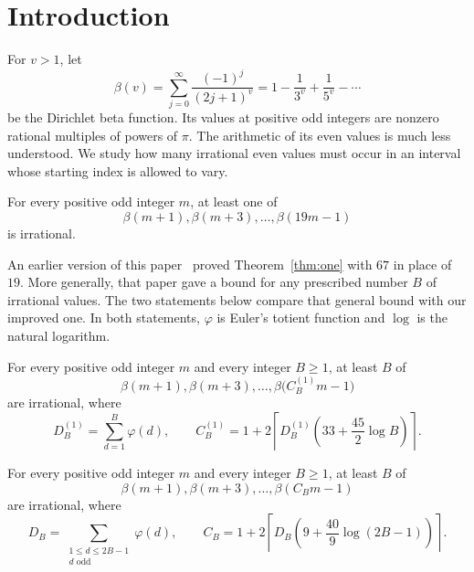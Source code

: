 \section{Introduction}\label{sec:introduction}

For $v>1$, let
\[
 \beta(v)=\sum_{j=0}^{\infty}\frac{(-1)^j}{(2j+1)^v}
         =1-\frac1{3^v}+\frac1{5^v}-\cdots
\]
be the Dirichlet beta function. Its values at positive odd integers
are nonzero rational multiples of powers of $\pi$. The arithmetic
of its even values is much less understood. We study how many
irrational even values must occur in an interval whose starting
index is allowed to vary.

\begin{theorem}\label{thm:one}
For every positive odd integer $m$, at least one of
\[
 \beta(m+1),\beta(m+3),\ldots,\beta(19m-1)
\]
is irrational.
\end{theorem}

\noindent\begin{minipage}{\linewidth}
An earlier version of this paper~\cite{TshiftV1} proved
Theorem~\ref{thm:one} with $67$ in place of $19$. More generally,
that paper gave a bound for any prescribed number $B$ of irrational values.
The two statements below compare that general bound with our
improved one.
In both statements, $\varphi$ is Euler's totient function and
$\log$ is the natural logarithm.

\begin{previousversion}
For every positive odd integer $m$ and every integer $B\ge1$,
at least $B$ of
\[
 \beta(m+1),\beta(m+3),\ldots,\beta\bigl(C_B^{(1)}m-1\bigr)
\]
are irrational, where
\[
 D_B^{(1)}=\sum_{d=1}^B\varphi(d),\qquad
 C_B^{(1)}=1+2\left\lceil D_B^{(1)}
                    \left(33+\frac{45}{2}\log B\right)\right\rceil.
\]
\end{previousversion}

\begin{theorem}\label{thm:intervals}
For every positive odd integer $m$ and every integer $B\ge1$,
at least $B$ of
\[
 \beta(m+1),\beta(m+3),\ldots,\beta(C_Bm-1)
\]
are irrational, where
\begin{equation}\label{eq:closed-endpoint}
 D_B=\sum_{\substack{1\le d\le2B-1\\d\text{ odd}}}\varphi(d),
 \qquad
 C_B=1+2\left\lceil D_B\left(9+\frac{40}{9}\log(2B-1)\right)\right\rceil.
\end{equation}
\end{theorem}
\end{minipage}\par\medskip

